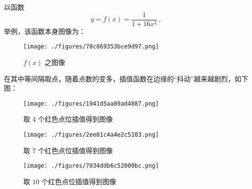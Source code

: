 以函数
$$y = f(x) = \frac1{1+16 x^2} ~,$$
举例，该函数本身图像为：
\begin{figure}[ht]
\centering
\texttt{[image: ./figures/78c869353bce9d97.png]}
\caption{$f(x)$ 之图像} \label{fig_PolyIP_1}
\end{figure}
在其中等间隔取点，随着点数的变多，插值函数在边缘的“抖动”越来越剧烈，如下图：
\begin{figure}[ht]
\centering
\texttt{[image: ./figures/1941d5aa89ad4887.png]}
\caption{取 $4$ 个红色点位插值得到图像} \label{fig_PolyIP_2}
\end{figure}
\begin{figure}[ht]
\centering
\texttt{[image: ./figures/2ee81c4a4e2c5103.png]}
\caption{取 $7$ 个红色点位插值得到图像} \label{fig_PolyIP_3}
\end{figure}
\begin{figure}[ht]
\centering
\texttt{[image: ./figures/7034ddb6c52000bc.png]}
\caption{取 $10$ 个红色点位插值得到图像} \label{fig_PolyIP_4}
\end{figure}
